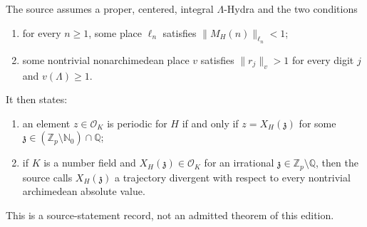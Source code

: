 \begin{sourceissue}
\label{thm:Siegel-correspondence-registered}
The source assumes a proper, centered, integral $\Lambda$-Hydra and the two
conditions
\begin{enumerate}
\item for every $n\geq1$, some place $\ell_n$ satisfies
  $\lVert M_H(n)\rVert_{\ell_n}<1$;
\item some nontrivial nonarchimedean place $v$ satisfies
  $\lVert r_j\rVert_v>1$ for every digit $j$ and $v(\Lambda)\geq1$.
\end{enumerate}
It then states:
\begin{enumerate}
\item an element $z\in\mathcal O_K$ is periodic for $H$ if and only if
  $z=X_H(\mathfrak z)$ for some
  $\mathfrak z\in(\mathbb Z_p\setminus\mathbb N_0)\cap\mathbb Q$;
\item if $K$ is a number field and
  $X_H(\mathfrak z)\in\mathcal O_K$ for an irrational
  $\mathfrak z\in\mathbb Z_p\setminus\mathbb Q$, then the source calls
  $X_H(\mathfrak z)$ a trajectory divergent with respect to every
  nontrivial archimedean absolute value.
\end{enumerate}
This is a source-statement record, not an admitted theorem of this edition.
\end{sourceissue}

